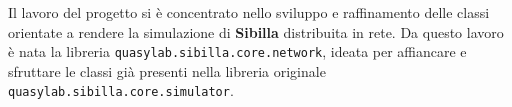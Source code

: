 
Il lavoro del progetto si è concentrato nello sviluppo e raffinamento delle classi orientate a rendere la simulazione di \textbf{Sibilla} distribuita in rete.
Da questo lavoro è nata la libreria \texttt{quasylab.sibilla.core.network}, ideata per affiancare e sfruttare le classi già presenti nella libreria originale \texttt{quasylab.sibilla.core.simulator}.